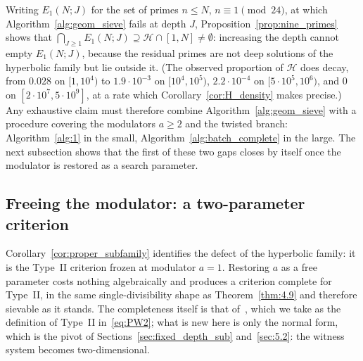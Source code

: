 \documentclass[11pt, a4paper]{article}
\theoremstyle{plain}
\theoremstyle{definition}
\begin{document}
Writing $E_1(N;J)$ for the set of primes $n\le N$, $n\equiv1\pmod{24}$, at which Algorithm~\ref{alg:geom_sieve} fails at depth $J$, Proposition~\ref{prop:nine_primes} shows that $\bigcap_{J\ge1}E_1(N;J)\supseteq\mathcal{H}\cap[1,N]\ne\emptyset$: increasing the depth cannot empty $E_1(N;J)$, because the residual primes are not deep solutions of the hyperbolic family but lie outside it. (The observed proportion of $\mathcal{H}$ does decay, from $0.028$ on $[1,10^4)$ to $1.9\cdot10^{-3}$ on $[10^4,10^5)$, $2.2\cdot10^{-4}$ on $[5\cdot10^5,10^6)$, and $0$ on $[2\cdot10^{7},5\cdot10^{9}]$, at a rate which Corollary~\ref{cor:H_density} makes precise.) Any exhaustive claim must therefore combine Algorithm~\ref{alg:geom_sieve} with a procedure covering the modulators $a\ge2$ and the twisted branch: Algorithm~\ref{alg:1} in the small, Algorithm~\ref{alg:batch_complete} in the large. The next subsection shows that the first of these two gaps closes by itself once the modulator is restored as a search parameter.

\subsection{Freeing the modulator: a two-parameter criterion} \label{sec:4.3ter}

Corollary~\ref{cor:proper_subfamily} identifies the defect of the hyperbolic family: it is the Type~II criterion frozen at modulator $a=1$. Restoring $a$ as a free parameter costs nothing algebraically and produces a criterion complete for Type~II, in the same single-divisibility shape as Theorem~\ref{thm:4.9} and therefore sievable as it stands. The completeness itself is that of~\cite[Cor.~2.2]{pomerance2026}, which we take as the definition of Type~II in~\eqref{eq:PW2}; what is new here is only the normal form, which is the pivot of Sections~\ref{sec:fixed_depth_sub} and~\ref{sec:5.2}: the witness system becomes two-dimensional.
\end{document}
